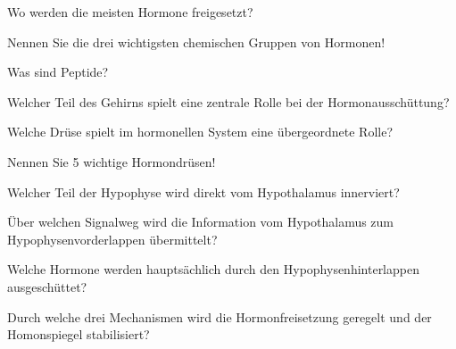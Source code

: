 \documentclass[10pt, a4paper]{exam}
\begin{document}
\begin{questions}
  \question Wo werden die meisten Hormone freigesetzt?
  \begin{solution}

  \end{solution}

  \question Nennen Sie die drei wichtigsten chemischen Gruppen von Hormonen!
  \begin{solution}

  \end{solution}

  \question Was sind Peptide?
  \begin{solution}

  \end{solution}

  \question Welcher Teil des Gehirns spielt eine zentrale Rolle bei der Hormonausschüttung?
  \begin{solution}

  \end{solution}

  \question Welche Drüse spielt im hormonellen System eine übergeordnete Rolle?
  \begin{solution}

  \end{solution}

  \question Nennen Sie 5 wichtige Hormondrüsen!
  \begin{solution}

  \end{solution}

  \question Welcher Teil der Hypophyse wird direkt vom Hypothalamus innerviert?
  \begin{solution}

  \end{solution}

  \question Über welchen Signalweg wird die Information vom Hypothalamus zum Hypophysenvorderlappen übermittelt?
  \begin{solution}

  \end{solution}

  \question Welche Hormone werden hauptsächlich durch den Hypophysenhinterlappen ausgeschüttet?
  \begin{solution}

  \end{solution}

  \question Durch welche drei Mechanismen wird die Hormonfreisetzung geregelt und der Homonspiegel stabilisiert?
  \begin{solution}


\end{solution}
\end{questions}
\end{document}
